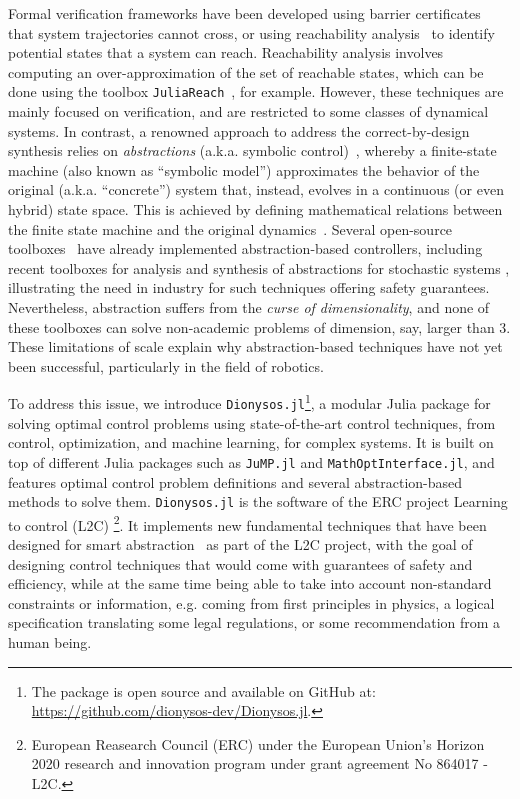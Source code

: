 \documentclass{juliacon}
\begin{document}
Formal verification frameworks have been developed using barrier certificates~\cite{prajna2006barrier,prajna2004safety} that system trajectories cannot cross, or using reachability analysis~\cite{althoff2010reachability} to identify potential states that a system can reach.
Reachability analysis involves computing an over-approximation of the set of reachable states, which can be done using the toolbox \texttt{JuliaReach}~\cite{bogomolov2019juliareach}, for example. However, these techniques are mainly focused on verification, and are restricted to some classes of dynamical systems.
%
In contrast, a renowned approach to address the correct-by-design synthesis relies on \emph{abstractions} (a.k.a. symbolic control)~\cite{tabuada2009verification}, whereby a finite-state machine (also known as ``symbolic model'') approximates the behavior of the original (a.k.a. ``concrete'') system that, instead, evolves in a continuous (or even hybrid) state space. 
This is achieved by defining mathematical relations between the finite state machine and the original dynamics~\cite{alur1998alternating,reissig2016feedback}. 
Several open-source toolboxes~\cite{mazo2010pessoa,Roy2011,rungger2016scots} have already implemented abstraction-based controllers, including recent toolboxes for analysis and synthesis of abstractions for stochastic systems \cite{Mathiesen2024,Wooding2024}, illustrating the need in industry for such techniques offering safety guarantees. Nevertheless, abstraction suffers from the \emph{curse of dimensionality}, and none of these toolboxes can solve non-academic problems of dimension, say, larger than $3$. These limitations of scale explain why abstraction-based techniques have not yet been successful, particularly in the field of robotics.

\vskip 6pt
To address this issue, we introduce \texttt{Dionysos.jl}\footnote{The package is open source and available on GitHub at: \url{https://github.com/dionysos-dev/Dionysos.jl}.}, a modular Julia \cite{bezanson2017julia} package for solving optimal control problems using state-of-the-art control techniques, from control, optimization, and machine learning, for complex systems.
It is built on top of different Julia packages such as \texttt{JuMP.jl} and \texttt{MathOptInterface.jl}, and
features optimal control problem definitions and several abstraction-based methods to solve them.
\texttt{Dionysos.jl} is the software of the ERC project Learning to control (L2C)%
\footnote{European Reasearch Council (ERC) under the European Union's Horizon 2020 research and innovation program under 
 grant agreement No 864017 - L2C.}.
%
It implements new fundamental techniques 
that have been designed for smart abstraction~\cite{calbert2021alternating,legat2021abstraction,egidio2022state,banse2023data,calbert2023data} as part of the L2C project, with the goal of designing control techniques that would come with guarantees of safety and efficiency, while at the same time being able to take into account non-standard constraints or information, e.g. coming from first principles in physics, a logical specification translating some legal regulations, or some recommendation from a human being.
\end{document}
